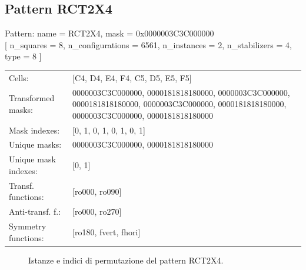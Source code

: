 \newpage

\subsection{Pattern RCT2X4}

\begin{tcolorbox}[sharp corners, fontupper=\ttfamily\small, colback=white]
  \noindent Pattern: name = RCT2X4, mask = 0x0000003C3C000000\\
  {[} n\_squares = 8, n\_configurations = 6561,
  n\_instances = 2, n\_stabilizers = 4, type = 8 { ]}\\[1.0ex]
  \begin{tabularx}{\textwidth}{@{} p{3.5cm} X @{}}
    Cells:               & {[}C4, D4, E4, F4, C5, D5, E5, F5{]}\\[0.5ex]
    Transformed masks:   & 0000003C3C000000, 0000181818180000, 0000003C3C000000, 0000181818180000, 0000003C3C000000, 0000181818180000, 0000003C3C000000, 0000181818180000\\[0.5ex]
    Mask indexes:        & {[}0, 1, 0, 1, 0, 1, 0, 1{]}\\[0.5ex]
    Unique masks:        & 0000003C3C000000, 0000181818180000\\[0.5ex]
    Unique mask indexes: & {[}0, 1{]}\\[0.5ex]
    Transf. functions:   & {[}ro000, ro090{]}\\[0.5ex]
    Anti-transf. f.:     & {[}ro000, ro270{]}\\[0.5ex]
    Symmetry functions:  & {[}ro180, fvert, fhori{]}\\[0.5ex]
  \end{tabularx}
\end{tcolorbox}

\begin{figure}[htbp]
  \centering
   \hfill
   \hfill
   \hfill
  \vspace{0.3cm}
   \hfill
   \hfill
   \hfill
  \caption{Istanze e indici di permutazione del pattern RCT2X4.}
\end{figure}

